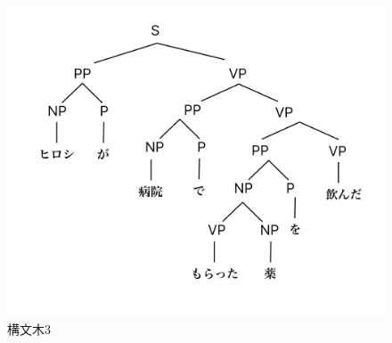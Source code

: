 \documentclass[dvipdfmx,autodetect-engine,titlepage]{jsarticle}
\begin{document}
 \begin{figure}[H]
    \centering
    \includegraphics[scale=0.17]{tree3.png}
    \caption{構文木3}\label{fig:図}
\end{figure}
\end{document}
